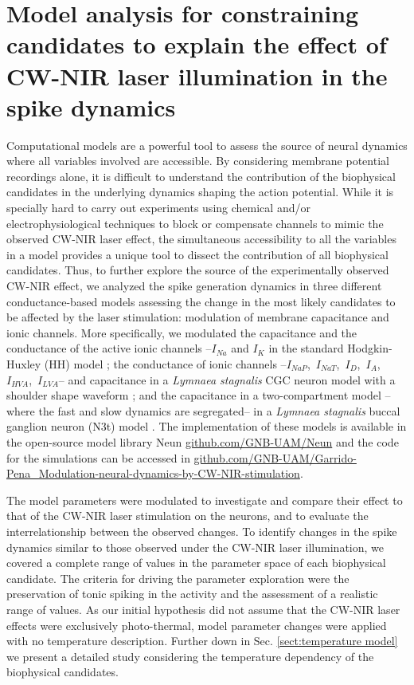 \section{Model analysis for constraining candidates to explain the effect of CW-NIR laser illumination in the spike dynamics}
\label{sect:models}
Computational models are a powerful tool to assess the source of neural dynamics where all variables involved are accessible. By considering membrane potential recordings alone, it is difficult to understand the contribution of the biophysical candidates in the underlying dynamics shaping the action potential. While it is specially hard to carry out experiments using chemical and/or electrophysiological techniques to block or compensate channels to mimic the observed CW-NIR laser effect, the simultaneous accessibility to all the variables in a model provides a unique tool to dissect the contribution of all biophysical candidates. Thus, to further explore the source of the experimentally observed CW-NIR effect, we analyzed the spike generation dynamics in three different conductance-based models assessing the change in the most likely candidates to be affected by the laser stimulation: modulation of membrane capacitance and ionic channels. More specifically, we modulated the capacitance and the conductance of the active ionic channels --$I_{Na}$ and $I_{K}$ in the standard Hodgkin-Huxley (HH) model \cite{Hodgkin1952}; the conductance of ionic channels --$I_{NaP}$,~$I_{NaT}$,~$I_{D}$,~$I_{A}$,~$I_{HVA}$,~$I_{LVA}$-- and capacitance in a \textit{Lymnaea stagnalis} CGC neuron model with a shoulder shape waveform \cite{Vavoulis2010}; and the capacitance in a two-compartment model --where the fast and slow dynamics are segregated-- in a \textit{Lymnaea stagnalis} buccal ganglion neuron (N3t) model \cite{Vavoulis2007}. The implementation of these models is available in the open-source model library Neun \href{https://github.com/GNB-UAM/neun}{github.com/GNB-UAM/Neun} and the code for the simulations can be accessed in \href{https://github.com/GNB-UAM/Garrido-Pena_Modulation-neural-dynamics-by-CW-NIR-stimulation}{github.com/GNB-UAM/Garrido-Pena\_Modulation-neural-dynamics-by-CW-NIR-stimulation}.


The model parameters were modulated to investigate and compare their effect to that of the CW-NIR laser stimulation on the neurons, and to evaluate the interrelationship between the observed changes. To identify changes in the spike dynamics similar to those observed under the CW-NIR laser illumination, we covered a complete range of values in the parameter space of each biophysical candidate. The criteria for driving the parameter exploration were the preservation of tonic spiking in the activity and the assessment of a realistic range of values.
As our initial hypothesis did not assume that the CW-NIR laser effects were exclusively photo-thermal, model parameter changes were applied with no temperature description. Further down in Sec. \ref{sect:temperature model} we present a detailed study considering the temperature dependency of the biophysical candidates. 


